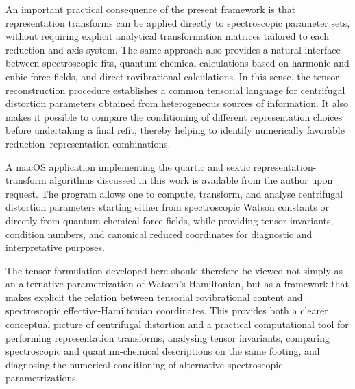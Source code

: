 An important practical consequence of the present framework is that
representation transforms can be applied directly to spectroscopic
parameter sets, without requiring explicit analytical transformation
matrices tailored to each reduction and axis system.  The same
approach also provides a natural interface between spectroscopic fits,
quantum-chemical calculations based on harmonic and cubic force
fields, and direct rovibrational calculations.  In this sense, the
tensor reconstruction procedure establishes a common tensorial language
for centrifugal distortion parameters obtained from heterogeneous
sources of information.  It also makes it possible to compare the
conditioning of different representation choices before undertaking a
final refit, thereby helping to identify numerically favorable
reduction--representation combinations.

A macOS application implementing the quartic and sextic
representation-transform algorithms discussed in this work is
available from the author upon request.  The program allows one to
compute, transform, and analyse centrifugal distortion parameters
starting either from spectroscopic Watson constants or directly from
quantum-chemical force fields, while providing tensor invariants,
condition numbers, and canonical reduced coordinates for diagnostic and
interpretative purposes.

The tensor formulation developed here should therefore be viewed not
simply as an alternative parametrization of Watson's Hamiltonian, but
as a framework that makes explicit the relation between tensorial
rovibrational content and spectroscopic effective-Hamiltonian
coordinates.  This provides both a clearer conceptual picture of
centrifugal distortion and a practical computational tool for
performing representation transforms, analysing tensor invariants,
comparing spectroscopic and quantum-chemical descriptions on the same
footing, and diagnosing the numerical conditioning of alternative
spectroscopic parametrizations.
